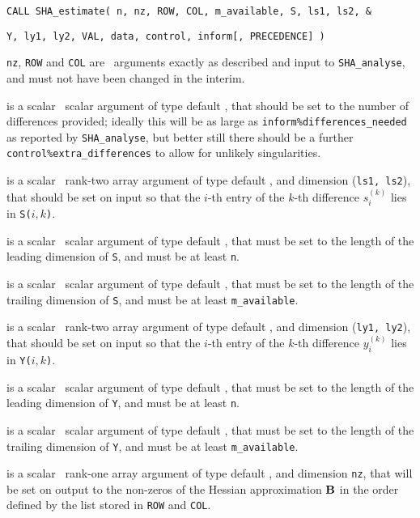 \documentclass{galahad}
\newcommand{\packagename}{SHA}
\begin{document}
\hspace{8mm}
{\tt CALL \packagename\_estimate( n, nz, ROW, COL, m\_available, S, ls1, ls2, \&}
\vspace*{-1mm}

\hspace{42mm}
{\tt Y, ly1, ly2, VAL, data, control, inform[, PRECEDENCE] )}

\vspace*{-2mm}
\begin{description}
 {\tt nz}, {\tt ROW} and {\tt COL} are  \intentin\ arguments 
exactly as described and input to {\tt \packagename\_analyse},
and must not have been changed in the interim.

is a scalar \intentin\ scalar argument of type default \integer, that should 
be set to the number of differences provided; ideally this will
be as large as {\tt inform\%differences\_needed} as reported by
{\tt \packagename\_\-analyse}, but better still there should be a 
further {\tt control\%extra\_differences} to allow for unlikely singularities.

 is a scalar \intentin\ rank-two array argument of type 
default \realdp, and dimension ({\tt ls1, ls2}), that should be set on input
so that the $i$-th entry of the $k$-th difference $s_i^{(k)}$ lies in
{\tt S(}$i, k${\tt )}.  

is a scalar \intentin\ scalar argument of type default \integer, that must be
set to the length of the leading dimension of {\tt S}, and must be at least
{\tt n}. 

is a scalar \intentin\ scalar argument of type default \integer, that must be
set to the length of the trailing dimension of {\tt S}, and must be at least
{\tt m\_available}. 

 is a scalar \intentin\ rank-two array argument of type 
default \realdp, and dimension ({\tt ly1, ly2}), that should be set on input
so that the $i$-th entry of the $k$-th difference $y_i^{(k)}$ lies in
{\tt Y(}$i, k${\tt )}.  

is a scalar \intentin\ scalar argument of type default \integer, that must be
set to the length of the leading dimension of {\tt Y}, and must be at least
{\tt n}. 

is a scalar \intentin\ scalar argument of type default \integer, that must be
set to the length of the trailing dimension of {\tt Y}, and must be at least
{\tt m\_available}. 

 is a scalar \intentout\ rank-one array argument of type 
default \realdp, and dimension {\tt nz}, that will be set on output
to the non-zeros of the Hessian approximation ${\mathbf{B}}$ in the
order defined by the list stored in {\tt ROW} and {\tt COL}.


\end{description}
\end{document}
